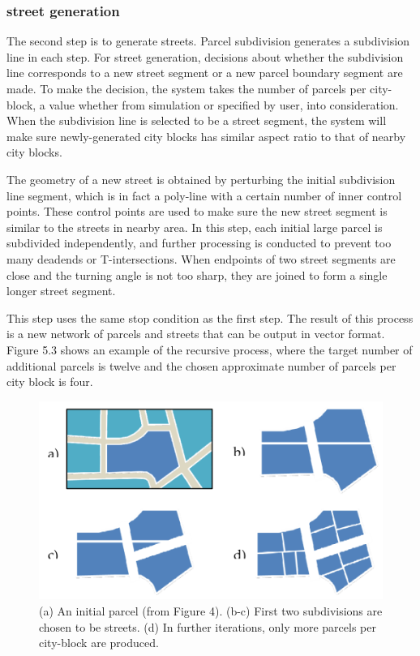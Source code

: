 \documentclass{egpubl}
\begin{document}
\subsubsection{street generation}
The second step is to generate streets. Parcel subdivision generates a subdivision line in each step. For street generation, decisions about whether the subdivision line corresponds to a new street segment or a new parcel boundary segment are made. To make the decision, the system takes the number of parcels per city-block, a value whether from simulation or specified by user, into consideration. When the subdivision line is selected to be a street segment, the system will make sure newly-generated city blocks has similar aspect ratio to that of nearby city blocks.

The geometry of a new street is obtained by perturbing the initial subdivision line segment, which is in fact a poly-line with a certain number of inner control points. These control points are used to make sure the new street segment is similar to the streets in nearby area. In this step, each initial large parcel is subdivided independently, and further processing is conducted to prevent too many deadends or T-intersections. When endpoints of two street segments are close and the turning angle is not too sharp, they are joined to form a single longer street segment.

This step uses the same stop condition as the first step. The result of this process is a new network of parcels and streets that can be output in vector format. Figure 5.3 shows an example of the recursive process, where the target number of additional parcels is twelve and the chosen approximate number of parcels per city block is four.

\begin{figure}[htb]
  \centering
  \includegraphics[width=.95\linewidth]{star-5-3}
  \caption{\label{fig:star-5-3} (a) An initial parcel (from Figure 4). (b-c) First two subdivisions are chosen to be streets. (d) In further iterations, only more parcels per city-block are produced.}
\end{figure}
\end{document}
